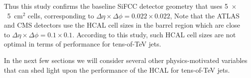 Thus this study confirms the  baseline SiFCC detector geometry \cite{Chekanov:2016ppq}
that uses 5~$\times$~5~cm$^2$ cells,
corresponding to $\Delta \eta \times \Delta \phi = 0.022\times0.022$,
Note that the ATLAS and CMS detectors use the HCAL cell sizes in the barrel region which are close to 
$\Delta \eta \times \Delta \phi = 0.1\times0.1$.  According to this study,
such HCAL cell sizes are not optimal in terms of performance  for tens-of-TeV jets.

In the next few sections we will consider several other physics-motivated
variables that can shed light  upon the performance of the HCAL for tens-of-TeV jets.

\begin{figure}
\begin{center}
\end{center}
\end{figure}
